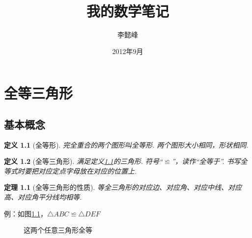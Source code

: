 \documentclass[oneside]{ctexbook}
\begin{document}
\newtheorem{definition}{定义}[section]
\newtheorem{theorem}{定理}[section]
\newtheorem{lemma}[theorem]{引理}
\newtheorem{corollary}[theorem]{推论}

\title{我的数学笔记}
\author{李懿峰}
\date{2012年9月}
\maketitle
\tableofcontents
\chapter{全等三角形}

\section{基本概念}
\begin{definition}[全等形]
    \label{qdx}
    完全重合的两个图形叫全等形.  两个图形大小相同，形状相同.
\end{definition}

\begin{definition}[全等三角形]
    满足定义\ref{qdx}的三角形. 符号“$\backcong$”，读作“全等于”. 书写全等式时要把对应定点字母放在对应的位置上.
\end{definition}

\begin{theorem}[全等三角形的性质]
    等全三角形的对应边、对应角、对应中线、对应高、对应角平分线均相等.
\end{theorem}

例：如图\ref{p1}，$\triangle ABC\backcong\triangle DEF$
\begin{figure}[htbp]
        \centering
        \caption{这两个任意三角形全等}
        \label{p1}
    \end{figure}
\end{document}
